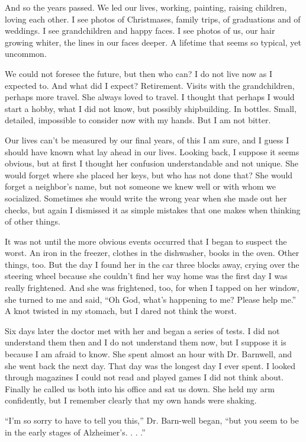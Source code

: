 \documentclass[10pt, twoside, openright]{book}
\begin{document}
And so the years passed. We led our lives, working, painting, raising
children, loving each other. I see photos of Christmases, family trips,
of graduations and of weddings. I see grandchildren and happy faces. I
see photos of us, our hair growing whiter, the lines in our faces
deeper. A lifetime that seems so typical, yet uncommon.

We could not foresee the future, but then who can? I do not live now as
I expected to. And what did I expect? Retirement. Visits with the
grandchildren, perhaps more travel. She always loved to travel. I
thought that perhaps I would start a hobby, what I did not know, but
possibly shipbuilding. In bottles. Small, detailed, impossible to
consider now with my hands. But I am not bitter.

Our lives can't be measured by our final years, of this I am sure, and I
guess I should have known what lay ahead in our lives. Looking back, I
suppose it seems obvious, but at first I thought her confusion
understandable and not unique. She would forget where she placed her
keys, but who has not done that? She would forget a neighbor's name, but
not someone we knew well or with whom we socialized. Sometimes she would
write the wrong year when she made out her checks, but again I dismissed
it as simple mistakes that one makes when thinking of other things.

It was not until the more obvious events occurred that I began to
suspect the worst. An iron in the freezer, clothes in the dishwasher,
books in the oven. Other things, too. But the day I found her in the car
three blocks away, crying over the steering wheel because she couldn't
find her way home was the first day I was really frightened. And she was
frightened, too, for when I tapped on her window, she turned to me and
said, ``Oh God, what's happening to me? Please help me.'' A knot twisted
in my stomach, but I dared not think the worst.

Six days later the doctor met with her and began a series of tests. I
did not understand them then and I do not understand them now, but I
suppose it is because I am afraid to know. She spent almost an hour with
Dr. Barnwell, and she went back the next day. That day was the longest
day I ever spent. I looked through magazines I could not read and played
games I did not think about. Finally he called us both into his office
and sat us down. She held my arm confidently, but I remember clearly
that my own hands were shaking.

``I'm so sorry to have to tell you this,'' Dr. Barn-well began, ``but
you seem to be in the early stages of Alzheimer's. . . .''
\end{document}
